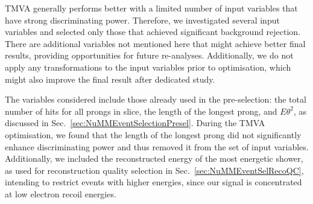 

\gls{TMVA} generally performs better with a limited number of input variables that have strong discriminating power. Therefore, we investigated several input variables and selected only those that achieved significant background rejection. There are additional variables not mentioned here that might achieve better final results, providing opportunities for future re-analyses. Additionally, we do not apply any transformations to the input variables prior to optimisation, which might also improve the final result after dedicated study.

The variables considered include those already used in the pre-selection: the total number of hits for all prongs in slice, the length of the longest prong, and $E\theta^2$, as discussed in Sec.~\ref{sec:NuMMEventSelectionPresel}. During the \gls{TMVA} optimisation, we found that the length of the longest prong did not significantly enhance discriminating power and thus removed it from the set of input variables. Additionally, we included the reconstructed energy of the most energetic shower, as used for reconstruction quality selection in Sec.~\ref{sec:NuMMEventSelRecoQC}, intending to restrict events with higher energies, since our signal is concentrated at low electron recoil energies.

